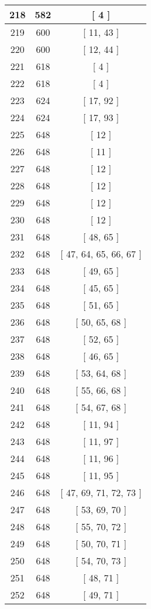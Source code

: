 \begin{center}
\begin{longtable}[H]{|| c c c ||}
\hline
218 & 582 & [ 4 ] \\ 
\hline
219 & 600 & [ 11, 43 ] \\ 
\hline
220 & 600 & [ 12, 44 ] \\ 
\hline
221 & 618 & [ 4 ] \\ 
\hline
222 & 618 & [ 4 ] \\ 
\hline
223 & 624 & [ 17, 92 ] \\ 
\hline
224 & 624 & [ 17, 93 ] \\ 
\hline
225 & 648 & [ 12 ] \\ 
\hline
226 & 648 & [ 11 ] \\ 
\hline
227 & 648 & [ 12 ] \\ 
\hline
228 & 648 & [ 12 ] \\ 
\hline
229 & 648 & [ 12 ] \\ 
\hline
230 & 648 & [ 12 ] \\ 
\hline
231 & 648 & [ 48, 65 ] \\ 
\hline
232 & 648 & [ 47, 64, 65, 66, 67 ] \\ 
\hline
233 & 648 & [ 49, 65 ] \\ 
\hline
234 & 648 & [ 45, 65 ] \\ 
\hline
235 & 648 & [ 51, 65 ] \\ 
\hline
236 & 648 & [ 50, 65, 68 ] \\ 
\hline
237 & 648 & [ 52, 65 ] \\ 
\hline
238 & 648 & [ 46, 65 ] \\ 
\hline
239 & 648 & [ 53, 64, 68 ] \\ 
\hline
240 & 648 & [ 55, 66, 68 ] \\ 
\hline
241 & 648 & [ 54, 67, 68 ] \\ 
\hline
242 & 648 & [ 11, 94 ] \\ 
\hline
243 & 648 & [ 11, 97 ] \\ 
\hline
244 & 648 & [ 11, 96 ] \\ 
\hline
245 & 648 & [ 11, 95 ] \\ 
\hline
246 & 648 & [ 47, 69, 71, 72, 73 ] \\ 
\hline
247 & 648 & [ 53, 69, 70 ] \\ 
\hline
248 & 648 & [ 55, 70, 72 ] \\ 
\hline
249 & 648 & [ 50, 70, 71 ] \\ 
\hline
250 & 648 & [ 54, 70, 73 ] \\ 
\hline
251 & 648 & [ 48, 71 ] \\ 
\hline
252 & 648 & [ 49, 71 ] \\ 

\end{longtable}
\end{center}
